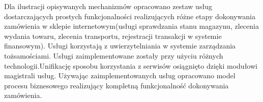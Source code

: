 	Dla ilustracji opisywanych mechanizmów opracowano zestaw usług dostarczających prostych funkcjonalności realizujących różne etapy dokonywania zamówienia w sklepie internetowym(usługi sprawdzania stanu magazynu, zlecenia wydania towaru,   zlecenia transportu, rejestracji transakcji w systemie finansowym). Usługi korzystają z uwierzytelniania w systemie zarządzania tożsamościami. Usługi zaimplementowane zostały przy użyciu różnych technologii.Unifikację sposobu korzystania z serwisów osiągnięto dzięki modułowi magistrali usług. Używając zaimplementowanych usług opracowano model procesu biznesowego realizujący kompletną funkcjonalność dokonywania zamówienia.
